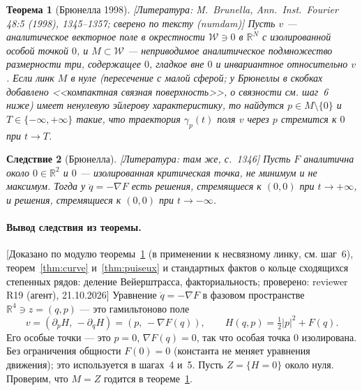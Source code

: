\documentclass[11pt,a4paper]{article}
\newtheorem{theorem}{Теорема}[section]
\newtheorem{corollary}[theorem]{Следствие}
\theoremstyle{definition}
\newcommand{\R}{\mathbb R}
\newcommand{\mk}[1]{\textsf{[#1]}}
\newcommand{\term}[1]{\emph{#1}}
\begin{document}
\begin{theorem}[Брюнелла 1998]\label{thm:brunella}
\mk{Литература: M.~Brunella, Ann.\ Inst.\ Fourier 48:5 (1998), 1345--1357; сверено по тексту
(numdam)} Пусть $v$ --- аналитическое векторное поле в окрестности $\mathcal W\ni0$ в $\R^N$ с
изолированной особой точкой $0$, и $M\subset\mathcal W$ --- неприводимое аналитическое подмножество
размерности три, содержащее $0$, гладкое вне $0$ и инвариантное относительно $v$. Если
\term{линк} $M$ в нуле (пересечение с малой сферой; у Брюнеллы в скобках добавлено <<компактная
связная поверхность>>, о связности см. шаг~6 ниже) имеет ненулевую эйлерову характеристику, то
найдутся $p\in M\setminus\{0\}$ и $T\in\{-\infty,+\infty\}$ такие, что траектория $\gamma_p(t)$ поля $v$
через $p$ стремится к $0$ при $t\to T$.
\end{theorem}

\begin{corollary}[Брюнелла]\label{cor:brunella}
\mk{Литература: там же, с.~1346} Пусть $F$ аналитична около $0\in\R^2$ и $0$ --- изолированная
критическая точка, \emph{не минимум и не максимум}. Тогда у $\ddot q=-\nabla F$ есть решения,
стремящиеся к $(0,0)$ при $t\to+\infty$, и решения, стремящиеся к $(0,0)$ при $t\to-\infty$.
\end{corollary}

\paragraph{Вывод следствия из теоремы.} \mk{Доказано по модулю теоремы~\ref{thm:brunella} (в
применении к несвязному линку, см. шаг~6), теорем~\ref{thm:curve} и~\ref{thm:puiseux} и стандартных
фактов о кольце сходящихся степенных рядов: деление Вейерштрасса, факториальность; проверено:
reviewer R19 (агент), 21.10.2026} Уравнение $\ddot q=-\nabla F$ в фазовом пространстве $\R^4\ni z=(q,p)$ --- это
гамильтоново поле
\[
v=(\partial_pH,\,-\partial_qH)=(p,\,-\nabla F(q)),\qquad H(q,p)=\tfrac12|p|^2+F(q).
\]
Его особые точки --- это $p=0$, $\nabla F(q)=0$, так что особая точка $0$ изолирована. Без
ограничения общности $F(0)=0$ (константа не меняет уравнения движения); это используется в шагах~4
и~5. Пусть $Z=\{H=0\}$ около нуля. Проверим, что $M=Z$ годится в теореме~\ref{thm:brunella}.
\end{document}
